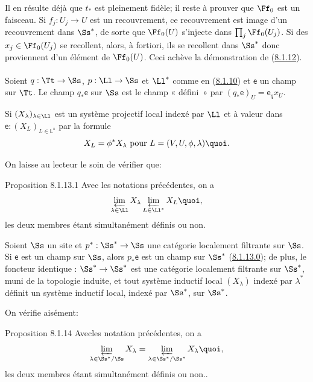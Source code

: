 Il en résulte déjà que $t_{\ast}$ est pleinement fidèle; il reste à prouver
que $\Ff_{0}$ est un faisceau. Si $f_j : U_j \to U$ est
un recouvrement, ce recouvrement est image d'un recouvrement dans
$\Ss^{\ast}$, de sorte que $\Ff_{0}(U)$ s'injecte dans
$\prod_j \Ff_{0}(U_j)$. Si des $x_j
\in \Ff_{0}(U_j)$ se recollent, alors, à fortiori, ils se
recollent dans $\Ss^{\ast}$ donc proviennent d'un élément de
$\Ff_{0}(U)$. Ceci achève la démonstration de (\hyperref[V.prop8.1.12]{8.1.12}).

\setcounter{subsubsection}{13}
\setcounter{paragraph}{-1}
\paragraph{}

Soient $q : \Tt \to \Ss$, $p : \Ll \to \Ss$ et
$\Ll^{\ast}$ comme en (\hyperref[V.subsubsec8.1.10]{8.1.10}) et $\mathsf{e}$ un champ sur
$\Tt$. Le champ $q_{\ast}\mathsf{e}$ sur $\Ss$ est le champ «
défini » par $(q_{\ast} \mathsf{e})_U = \mathsf{e}_q x_{U}$.

Si $(X_{\lambda})_{\lambda \in \Ll}$ est un système projectif
local indexé par $\Ll$ et à valeur dans $\mathsf{e} : (X_L)_{L
\in \mathsf{L^{x}}}$ par la formule
$$
X_L = \phi^{\ast} X_{\lambda} \text{ pour } L = (V, U, \phi, \lambda){\quoi}.
$$

On laisse au lecteur le soin de vérifier que:

\begin{enonce*}{Proposition 8.1.13.1}
Avec les notations précédentes, on a
$$
\varprojlim_{\lambda \in \Ll} X_{\lambda}
\varprojlim_{L \in \Ll^{\ast}} X_L{\quoi},
$$
les deux membres étant simultanément définis ou non.
\end{enonce*}

Soient $\Ss$ un site et $p^{\ast} : \Ss^{\ast} \to \Ss$ une catégorie localement
filtrante sur $\Ss$. Si $\mathsf{e}$ est un champ sur $\Ss$, alors $p_{\ast}
\mathsf{e}$ est un champ sur $\Ss^{\ast}$ (\hyperref[V.par8.1.13.0]{8.1.13.0}); de plus, le foncteur
identique : $\Ss^{\ast} \to \Ss^{\ast}$ est une catégorie localement filtrante sur
$\Ss^{\ast}$, muni de la topologie induite, et tout système inductif local
$(X_{\lambda})$ indexé par $\lambda^{\ast}$ définit un système inductif
local, indexé par $\Ss^{\ast}$, sur $\Ss^{\ast}$.

On vérifie aisément:

\begin{enonce*}{Proposition 8.1.14}
Avec\pageoriginale les notation précédentes, on a
$$
\varprojlim_{\lambda \in \Ss^{\ast} /\Ss} X_{\lambda} =
\varprojlim_{\lambda \in \Ss^{\ast} /\Ss^{\ast}} X_{\lambda} {\quoi},
$$
les deux membres étant simultanément définis ou non..
\end{enonce*}

